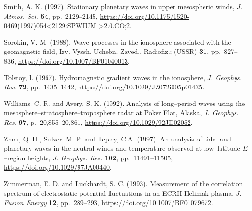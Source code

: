 \documentclass[a4paper,openany,12pt]{report}
\begin{document}
\begin{thebibliography}{100}
\bibitem{}
Smith, A. K. (1997). Stationary planetary waves in upper mesospheric winds, {\it J. Atmos. Sci.} \textbf{54}, pp.~2129--2145, \url{https://doi.org/10.1175/1520-0469(1997)054<2129:SPWIUM >2.0.CO;2}.

\bibitem{}
Sorokin, V. M. (1988). Wave processes in the ionosphere associated with the geomagnetic field, Izv. Vyssh. Uchebn. Zaved., Radiofiz.; (USSR) \textbf{31}, pp.~827--836, \url{https://doi.org/10.1007/BF01040013}.

\bibitem{}
Tolstoy, I. (1967). Hydromagnetic gradient waves in the ionosphere, \emph{J. Geophys. Res.} \textbf{72}, pp.~1435--1442, \url{https://doi.org/10.1029/JZ072i005p01435}. 

\bibitem{}
Williams, C. R. and Avery, S. K. (1992). Analysis of long--period waves using the mesosphere--stratosphere--troposphere radar at Poker Flat, Alaska, {\it J. Geophys. Res.} \textbf{97}, 
p.~20,855--20,861, \url{https://doi.org/10.1029/92JD02052}.

\bibitem{}
Zhou, Q. H., Sulzer, M. P. and Tepley, C.A. (1997). An analysis of tidal and planetary waves in the neutral winds and temperature observed at low--latitude $E$--region heights, {\it J. Geophys. Res.} \textbf{102}, pp.~11491--11505, 
\url{https://doi.org/10.1029/97JA00440}.

\bibitem{}
Zimmerman, E. D. and Luckhardt, S. C. (1993). Measurement of the correlation spectrum of electrostatic potential fluctuations in an ECRH Helimak plasma, {\it J. Fusion Energy} \textbf{12}, pp.~289--293, \url{https://doi.org/10.1007/BF01079672}.

\end{thebibliography}
\end{document}
